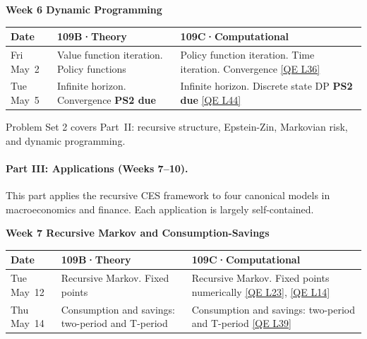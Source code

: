 \vspace{0.8em}
\noindent\textbf{Week 6 \hfill Dynamic Programming}
\vspace{0.3em}

\begin{tabularx}{\textwidth}{@{}p{2.1cm}YY@{}}
\toprule
\textbf{Date} & \textbf{109B\enspace·\enspace Theory} & \textbf{109C\enspace·\enspace Computational} \\
\midrule
Fri May~2  &
Value function iteration. Policy functions &
Policy function iteration. Time iteration. Convergence \newline
\href{https://julia.quantecon.org/dynamic_programming/coleman_policy_iter.html}{[QE L36]} \\[4pt]
Tue May~5 &
Infinite horizon. Convergence \newline \textbf{PS2 due} &
Infinite horizon. Discrete state DP \newline \textbf{PS2 due} \newline
\href{https://julia.quantecon.org/dynamic_programming/discrete_dp.html}{[QE L44]} \\
\bottomrule
\end{tabularx}

\begin{calloutnote}
Problem Set 2 covers Part~II: recursive structure, Epstein-Zin, Markovian risk, and dynamic programming.
\end{calloutnote}

\paragraph{Part III: Applications (Weeks 7--10).}
This part applies the recursive CES framework to four canonical models in macroeconomics and finance.
Each application is largely self-contained.

\vspace{0.5em}
\noindent\textbf{Week 7 \hfill Recursive Markov and Consumption-Savings}
\vspace{0.3em}

\begin{tabularx}{\textwidth}{@{}p{2.1cm}YY@{}}
\toprule
\textbf{Date} & \textbf{109B\enspace·\enspace Theory} & \textbf{109C\enspace·\enspace Computational} \\
\midrule
Tue May~12 &
Recursive Markov. Fixed points &
Recursive Markov. Fixed points numerically \newline
\href{https://julia.quantecon.org/introduction_dynamics/ar1_processes.html}{[QE L23]},
\href{https://julia.quantecon.org/software_engineering/need_for_speed.html}{[QE L14]} \\[4pt]
Thu May~14 &
Consumption and savings: two-period and T-period &
Consumption and savings: two-period and T-period \newline
\href{https://julia.quantecon.org/dynamic_programming/perm_income.html}{[QE L39]} \\
\bottomrule
\end{tabularx}

